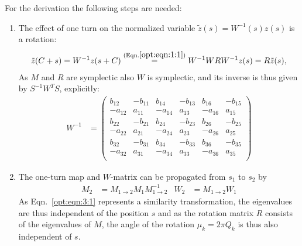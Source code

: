 \documentclass[english]{article}
\begin{document}
For the derivation the following steps are needed:
\begin{enumerate}
\item The effect of one turn on the normalized variable $\tilde z(s)=W^{-1}(s) z(s)$ is a rotation:
\begin{align}\label{opt:eqn:3:1}
\tilde z(C+s) = W^{-1}z(s+C)\overset{(\rm Eqn.\ref{opt:eqn:1:1})}{=}W^{-1}WRW^{-1}z(s)= R\tilde z(s),
\end{align}
As $M$ and $R$ are symplectic also $W$ is symplectic, and its inverse is thus given by $S^{-1}W^{T}S$, explicitly:
\begin{align}
W^{-1}&=
\left(
\begin{array}{cccccc}
b_{12} & - b_{11} &   b_{14} & - b_{13} &   b_{16} & - b_{15}\\
- a_{12} &   a_{11} & - a_{14} &   a_{13} & - a_{16} &   a_{15}\\
b_{22} & - b_{21} &   b_{24} & - b_{23} &   b_{26} & - b_{25}\\
- a_{22} &   a_{21} & - a_{24} &   a_{23} & - a_{26} &   a_{25}\\
b_{32} & - b_{31} &   b_{34} & - b_{33} &   b_{36} & - b_{35}\\
- a_{32} &   a_{31} & - a_{34} &   a_{33} & - a_{36} &   a_{35}\\
\end{array}
\right)
\end{align}
\item The one-turn map and $W$-matrix can be propagated from $s_1$ to $s_2$ by
\begin{align}
M_2&=M_{1 \to 2} M_1 M^{-1}_{1 \to 2}  &
W_2&=M_{1 \to 2} W_1
\end{align}
As Eqn.~\ref{opt:eqn:3:1} represents a similarity transformation, the eigenvalues are thus independent of the position $s$ and as the rotation matrix $R$ consists of the eigenvalues of $M$, the angle of the rotation $\mu_k=2\pi Q_k$ is thus also independent of $s$.


\end{enumerate}
\end{document}
